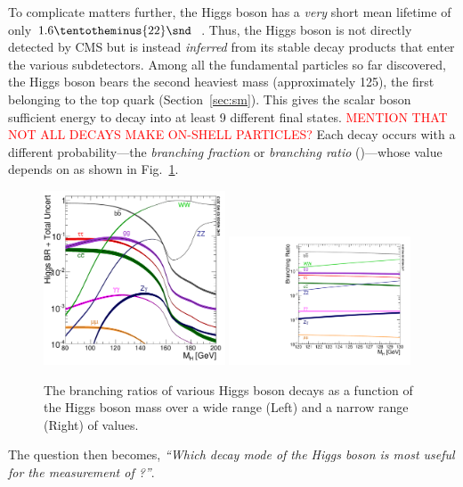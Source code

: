 To complicate matters further, the Higgs boson has a \emph{very} short mean lifetime of only $1.6 \tentotheminus{22}\snd$~\cite{pdg}.
Thus, the Higgs boson is not directly detected by CMS but is instead \emph{inferred} from its stable decay products that enter the various subdetectors.
Among all the fundamental particles so far discovered, the Higgs boson bears the second heaviest mass (approximately 125\GeV), the first belonging to the top quark (Section~\ref{sec:sm}).
This gives the scalar boson sufficient energy to decay into at least 9 different final states.
\textcolor{red}{MENTION THAT NOT ALL DECAYS MAKE ON-SHELL PARTICLES?}
Each decay occurs with a different probability---the \emph{branching fraction} or \emph{branching ratio} (\br)---whose value depends on \mH as shown in Fig.~\ref{fig:higgs_br}.
\begin{figure}[!htbp]
    \begin{center}
		\includegraphics[width=0.48\textwidth]{figures/higgsmassmeas/higgs_BR_80to200GeV.pdf}
		\includegraphics[width=0.48\textwidth]{figures/higgsmassmeas/higgs_BR_120to130GeV.pdf}
		\caption{
            The branching ratios of various Higgs boson decays as a function of the Higgs boson mass
            over a wide range (Left) and a narrow range (Right) of values.
            }
		\label{fig:higgs_br}
	\end{center}
\end{figure} 
The question then becomes, \emph{``Which decay mode of the Higgs boson is most useful for the measurement of \mH?''}.

